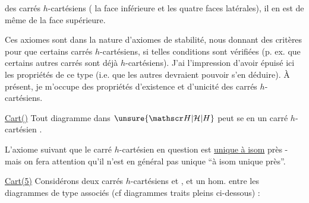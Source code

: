des carrés $h$-cartésiens ( la face inférieure et les quatre faces latérales), il en est de même de la face supérieure.

Ces axiomes sont dans la nature d'axiomes de stabilité, nous donnant des critères  pour que certains carrés  $h$-cartésiens, si telles conditions sont vérifiées (p. ex. que certains autres carrés sont déjà $h$-cartésiens). J'ai l'impression d'avoir  épuisé ici les propriétés  de ce type (i.e. que les autres devraient pouvoir s'en déduire). À présent, je m'occupe des propriétés d'existence et d'unicité des carrés $h$-cartésiens.

\margin{$\vert$}
\uline{Cart()}  Tout diagramme
dans $\unsure{\mathscr H|\mathcal H|H}$ peut se  en un carré $h$-cartésien
.

L'axiome suivant   que le carré $h$-cartésien en question est  \uline{unique à isom} près - mais on fera attention qu'il n'est en général pas unique ``à isom unique près''.

\uline{Cart(5)}  Considérons deux  carrés $h$-cartésiens
et
, et un hom.  entre les diagrammes de type
associés (cf diagrammes traits pleins ci-dessous) :
